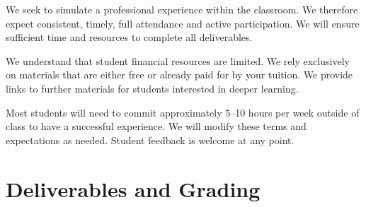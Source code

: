 \documentclass[12pt]{article}
\begin{document}
We seek to simulate a professional experience within the classroom. We therefore expect consistent, timely, full attendance and active participation. We will ensure sufficient time and resources to complete all deliverables. %

We understand that student financial resources are limited. We rely exclusively on materials that are either free or already paid for by your tuition. We provide links to further materials for students interested in deeper learning. %

Most students will need to commit approximately 5--10 hours per week outside of class to have a successful experience. We will modify these terms and expectations as needed. Student feedback is welcome at any point. 

\vspace{0.5cm}







\section*{Deliverables and Grading}
\end{document}
